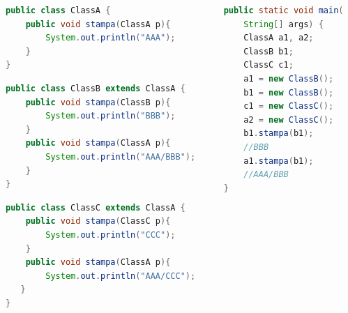 \documentclass{beamer}
\begin{document}
\begin{frame}[fragile]
\begin{columns}
\begin{column}{0.6\textwidth}
\begin{lstlisting}[language=Java,escapechar=|]
public class ClassA {
    public void stampa(ClassA p){
        System.out.println("AAA");
    }
}
\end{lstlisting}
\begin{lstlisting}[language=Java,escapechar=|]
public class ClassB extends ClassA {
    public void stampa(ClassB p){
        System.out.println("BBB");
    }
    public void stampa(ClassA p){
        System.out.println("AAA/BBB");
    }
}
\end{lstlisting}
\begin{lstlisting}[language=Java,escapechar=|]
public class ClassC extends ClassA {
    public void stampa(ClassC p){
        System.out.println("CCC");
    }
    public void stampa(ClassA p){
        System.out.println("AAA/CCC");
   }
}
\end{lstlisting}
\end{column}
\begin{column}{0.4\textwidth}
\begin{lstlisting}[language=Java,escapechar=|]
public static void main(
    String[] args) {
    ClassA a1, a2;
    ClassB b1;
    ClassC c1;
    a1 = new ClassB();
    b1 = new ClassB();
    c1 = new ClassC();
    a2 = new ClassC();
    b1.stampa(b1); 
    //BBB
    a1.stampa(b1);  
    //AAA/BBB
}
\end{lstlisting}
\end{column}
\end{columns}
\end{frame}
\end{document}
